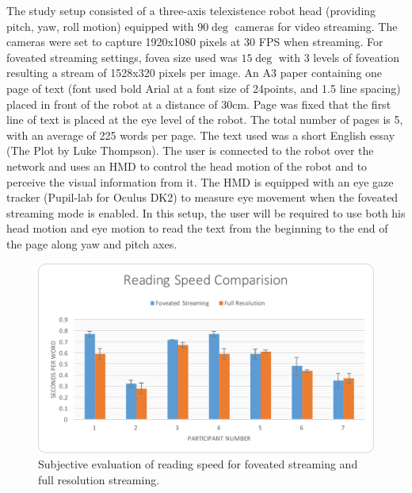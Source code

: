 The study setup consisted of a three-axis telexistence robot head (providing pitch, yaw, roll motion) equipped with $90\deg$ cameras for video streaming. The cameras were set to capture 1920x1080 pixels at 30 FPS when streaming. For foveated streaming settings, fovea size used was $15\deg$ with 3 levels of foveation resulting a stream of 1528x320 pixels per image. An A3 paper containing one page of text (font used bold Arial at a font size of 24points, and 1.5 line spacing) placed in front of the robot at a distance of 30cm. Page was fixed that the first line of text is placed at the eye level of the robot. The total number of pages is 5, with an average of 225 words per page. The text used was a short English essay (The Plot by Luke Thompson). The user is connected to the robot over the network and uses an HMD to control the head motion of the robot and to perceive the visual information from it. The HMD is equipped with an eye gaze tracker (Pupil-lab for Oculus DK2) to measure eye movement when the foveated streaming mode is enabled. In this setup, the user will be required to use both his head motion and eye motion to read the text from the beginning to the end of the page along yaw and pitch axes. 


\begin{figure} [hpbt]
\includegraphics[width=1\linewidth]{figures/system/fov-UserEval.pdf}
\centering
  \captionsetup{justification=centering}
\caption{Subjective evaluation of reading speed for foveated streaming and full resolution streaming.}
\label{fig.UserEval}
\end{figure}


